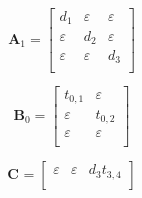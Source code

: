 \documentclass[11pt, a4paper, fleqn]{article}
\begin{document}
\begin{equation*}
\mathbf{A}_{1} = 
\left[\begin{array}{ ccc }
d_1	&\varepsilon	&\varepsilon\\
\varepsilon	&d_2	&\varepsilon\\
\varepsilon	&\varepsilon	&d_3\\
\end{array}\right]
\end{equation*}

\begin{equation*}
\mathbf{B}_{0} = 
\left[\begin{array}{ cc }
t_{0,1}	&\varepsilon\\
\varepsilon	&t_{0,2}\\
\varepsilon	&\varepsilon\\
\end{array}\right]
\end{equation*}

\begin{equation*}
\mathbf{C}_{{}} = 
\left[\begin{array}{ ccc }
\varepsilon	&\varepsilon	&d_3t_{3,4}\\
\end{array}\right]
\end{equation*}
\end{document}
